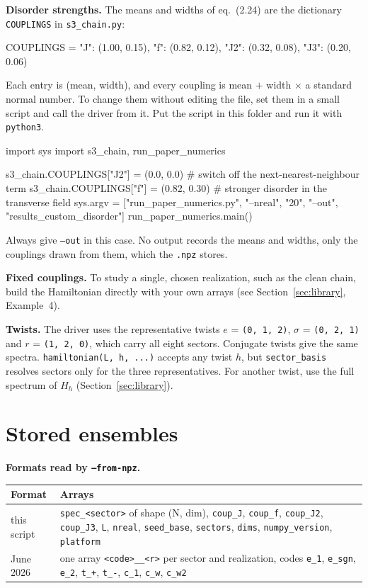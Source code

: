 \documentclass[11pt,a4paper]{article}
\newcommand{\code}[1]{\texttt{\textcolor{codeink}{#1}}}
\newcommand{\lead}[1]{\textbf{#1}\enspace}
\begin{document}
\lead{Disorder strengths.} The means and widths of eq.~(2.24) are the dictionary \code{COUPLINGS} in \code{s3\_chain.py}:
\begin{python}
COUPLINGS = {"J": (1.00, 0.15), "f": (0.82, 0.12), "J2": (0.32, 0.08), "J3": (0.20, 0.06)}
\end{python}
Each entry is (mean, width), and every coupling is mean $+$ width $\times$ a standard normal number. To change them
without editing the file, set them in a small script and call the driver from it. Put the script in this folder and
run it with \code{python3}.
\begin{python}
import sys
import s3_chain, run_paper_numerics

s3_chain.COUPLINGS["J2"] = (0.0, 0.0)        # switch off the next-nearest-neighbour term
s3_chain.COUPLINGS["f"] = (0.82, 0.30)       # stronger disorder in the transverse field
sys.argv = ["run_paper_numerics.py", "--nreal", "20", "--out", "results_custom_disorder"]
run_paper_numerics.main()
\end{python}
Always give \code{--out} in this case. No output records the means and widths, only the couplings drawn from them,
which the \code{.npz} stores.

\lead{Fixed couplings.} To study a single, chosen realization, such as the clean chain, build the Hamiltonian
directly with your own arrays (see Section~\ref{sec:library}, Example~4).

\lead{Twists.} The driver uses the representative twists $e$ = \code{(0,~1,~2)}, $\sigma$ = \code{(0,~2,~1)} and
$r$ = \code{(1,~2,~0)}, which carry all eight sectors. Conjugate twists give the same spectra. \code{hamiltonian(L, h, ...)} accepts any
twist $h$, but \code{sector\_basis} resolves sectors only for the three representatives. For another twist, use the
full spectrum of $H_h$ (Section~\ref{sec:library}).

\section{Stored ensembles}\label{sec:stored}

\lead{Formats read by \code{--from-npz}.}\par

\begingroup\small
\begin{tabularx}{\linewidth}{L{2.6cm}Y}
\toprule{}\textbf{Format} & \textbf{Arrays}\\\midrule
this script & \code{spec\_<sector>} of shape (N, dim), \code{coup\_J}, \code{coup\_f}, \code{coup\_J2}, \code{coup\_J3},
  \code{L}, \code{nreal}, \code{seed\_base}, \code{sectors}, \code{dims}, \code{numpy\_version}, \code{platform}\\
June 2026 & one array \code{<code>\_\_<r>} per sector and realization, codes \code{e\_1}, \code{e\_sgn}, \code{e\_2},
  \code{t\_+}, \code{t\_-}, \code{c\_1}, \code{c\_w}, \code{c\_w2}\\
\bottomrule
\end{tabularx}\par
\endgroup
\end{document}
